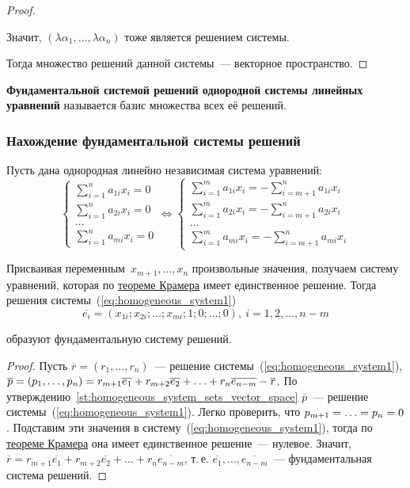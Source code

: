 \begin{proof}
\begin{itemize}
	Значит, $(\lambda \alpha_1, \ldots, \lambda \alpha_n)$ тоже является решением системы.
\end{itemize}

Тогда множество решений данной системы~--- векторное пространство.
\end{proof}

\textbf{Фундаментальной системой решений однородной системы линейных уравнений} называется базис множества всех её решений.

\subsubsection{Нахождение фундаментальной системы решений}
Пусть дана однородная линейно независимая система уравнений:
\begin{equation}
\label{eq:homogeneous_system1}
\begin{cases}
\displaystyle \sum_{i=1}^n a_{1i} x_i = 0 \\
\displaystyle \sum_{i=1}^n a_{2i} x_i = 0 \\
\ldots \\
\displaystyle \sum_{i=1}^n a_{mi} x_i = 0
\end{cases} \Leftrightarrow
\begin{cases}
\displaystyle \sum_{i=1}^m a_{1i} x_i = -\sum_{i=m+1}^n a_{1i} x_i \\
\displaystyle \sum_{i=1}^m a_{2i} x_i = -\sum_{i=m+1}^n a_{2i} x_i \\
\ldots \\
\displaystyle \sum_{i=1}^m a_{mi} x_i = -\sum_{i=m+1}^n a_{mi} x_i
\end{cases}
\end{equation}

Присваивая переменным~$x_{m+1}, \ldots, x_n$ произвольные значения, получаем систему уравнений, которая по \hyperref[th:Cramer]{теореме Крамера} имеет единственное решение.
Тогда решения системы~(\ref*{eq:homogeneous_system1})
\begin{equation*}
\overline{e_i} = (x_{1i}; x_{2i}; \ldots; x_{mi}; 1; 0; \ldots; 0), \ i = 1, 2, \ldots, n - m
\end{equation*}

образуют фундаментальную систему решений.
\begin{proof}
Пусть $\overline r = (r_1, \ldots, r_n)$~--- решение системы~(\ref*{eq:homogeneous_system1}), $\overline p = (p_1, \ldots, p_n) = r_{m+1} \overline{e_1} \opbr+ r_{m+2} \overline{e_2} \opbr+ \ldots \opbr+ r_n \overline{e_{n-m}} \opbr- \overline r$.
По утверждению~\ref*{st:homogeneous_system_sets_vector_space} $\overline p$~--- решение системы~(\ref*{eq:homogeneous_system1}).
Легко проверить, что $p_{m+1} \opbr= \ldots \opbr= p_n \opbr= 0$.
Подставим эти значения в систему~(\ref*{eq:homogeneous_system1}), тогда по \hyperref[th:Cramer]{теореме Крамера} она имеет единственное решение~--- нулевое.
Значит, $\overline r = r_{m+1} \overline{e_1} + r_{m+2} \overline{e_2} + \ldots + r_n \overline{e_{n-m}}$, т.\,е. $\overline{e_1}, \ldots, \overline{e_{n-m}}$~--- фундаментальная система решений.
\end{proof}

